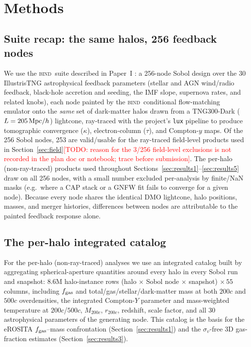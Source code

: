 \documentclass[11pt]{article}
\newcommand{\bind}{\textsc{bind}}
\newcommand{\fgas}{f_{\rm gas}}
\newcommand{\Mhalo}{M_{200c}}
\newcommand{\todo}[1]{\textcolor{red}{[TODO: #1]}}
\begin{document}
\section{Methods}\label{sec:methods}

\subsection{Suite recap: the same halos, 256 feedback nodes}\label{sec:suite}

We use the \bind\ suite described in Paper~I \citep[in prep.]{bindI}: a
256-node Sobol design over the 30 IllustrisTNG astrophysical feedback
parameters (stellar and AGN wind/radio feedback, black-hole accretion and
seeding, the IMF slope, supernova rates, and related knobs), each node painted
by the \bind\ conditional flow-matching emulator onto the \emph{same} set of
dark-matter halos drawn from a TNG300-Dark ($L=205\,{\rm Mpc}/h$) lightcone,
ray-traced with the project's \texttt{lux} pipeline to produce tomographic
convergence ($\kappa$), electron-column ($\tau$), and Compton-$y$ maps. %
Of the
256 Sobol nodes, 253 are valid/usable for the ray-traced field-level products
used in Section~\ref{sec:field}\todo{reason for the 3/256 field-level exclusions is not recorded in the plan doc or notebook; trace before submission}. %
The per-halo (non-ray-traced) products used throughout Sections~\ref{sec:results1}--\ref{sec:results5}
draw on all 256 nodes, with a small number excluded per-analysis by
finite/NaN masks (e.g.\ where a CAP stack or a GNFW fit fails to converge for a
given node). Because every node shares the identical DMO lightcone, halo
positions, masses, and merger histories, differences between nodes are
attributable to the painted feedback response alone.

\subsection{The per-halo integrated catalog}\label{sec:catalog}

For the per-halo (non-ray-traced) analyses we use an integrated catalog
built by aggregating spherical-aperture quantities around every halo in every
Sobol run and snapshot: $8.6$M halo-instance rows (halo $\times$ Sobol node
$\times$ snapshot) $\times\,55$ columns, including $\fgas$ and total/gas/stellar/dark-matter
mass at both $200c$ and $500c$ overdensities, the integrated Compton-$Y$
parameter and mass-weighted temperature at $200c$/$500c$, $\Mhalo$, $r_{200c}$,
redshift, scale factor, and all 30 astrophysical parameters of the generating
node. %
This catalog is the basis for the eROSITA $\fgas$--mass confrontation
(Section~\ref{sec:results1}) and the $\sigma_v$-free 3D gas-fraction estimates
(Section~\ref{sec:results3}).
\end{document}
